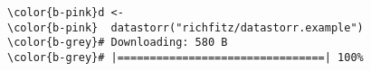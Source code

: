 \documentclass[class=minimal,border=0]{standalone}
\begin{document}
%
\begin{BVerbatim}[bgcolor=b-darkgrey]
\color{b-pink}d <-
\color{b-pink}  datastorr("richfitz/datastorr.example")
\color{b-grey}# Downloading: 580 B
\color{b-grey}# |================================| 100%
\end{BVerbatim}
\end{document}
